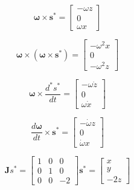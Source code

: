 \begin{equation}
\label{eq:velAngular_cross_s}
\boldsymbol\omega \times \boldsymbol s^* =
\begin{bmatrix}
    -\omega z \\
    0         \\
    \omega x
\end{bmatrix} 
\end{equation}

\begin{equation}
\label{eq:velAngular_cross_cross_s}
\boldsymbol\omega \times (\boldsymbol\omega \times \boldsymbol s^*) =
\begin{bmatrix}
    -\omega^2 x \\
    0           \\
    -\omega^2 z 
\end{bmatrix}
\end{equation}

\begin{equation}
\label{eq:omega_cross_dsdt}
\boldsymbol\omega \times \frac{d^* s^*}{dt} =
\begin{bmatrix}
    -\omega \dot z \\
    0                 \\
    \omega \dot x
\end{bmatrix}
\end{equation}

\begin{equation}
\label{eq:dOmega_cross_s}
\frac{d\boldsymbol\omega}{dt} \times \boldsymbol s^* =
\begin{bmatrix}
    -\dot\omega z \\
    0              \\
    \dot\omega x
\end{bmatrix}
\end{equation}

\begin{equation}
\label{eq:jacobiana_LVLH}
\mathbf Js^* =
\begin{bmatrix}
    1 & 0 & 0 \\
    0 & 1 & 0  \\
    0 & 0 & -2
\end{bmatrix} \boldsymbol s^* =
\begin{bmatrix}
    x \\
    y \\
    -2z
\end{bmatrix}
\end{equation}


